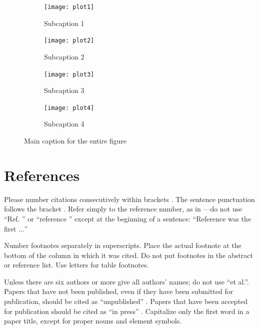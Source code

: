 \documentclass[conference]{IEEEtran}
\begin{document}
\begin{figure}[ht]
  \centering

  \begin{subfigure}{0.45\linewidth}
    \texttt{[image: plot1]}
    \caption{Subcaption 1}
    \label{fig:subfig1}
  \end{subfigure}

  \vspace{0.5cm}

  \begin{subfigure}{0.45\linewidth}
    \texttt{[image: plot2]}
    \caption{Subcaption 2}
    \label{fig:subfig2}
  \end{subfigure}

  \vspace{0.5cm}

  \begin{subfigure}{0.45\linewidth}
    \texttt{[image: plot3]}
    \caption{Subcaption 3}
    \label{fig:subfig3}
  \end{subfigure}

  \vspace{0.5cm}

  \begin{subfigure}{0.45\linewidth}
    \texttt{[image: plot4]}
    \caption{Subcaption 4}
    \label{fig:subfig4}
  \end{subfigure}

  \caption{Main caption for the entire figure}
  \label{fig:mainfigure}
\end{figure}










\section*{References}

Please number citations consecutively within brackets \cite{b1}. The 
sentence punctuation follows the bracket \cite{b2}. Refer simply to the reference 
number, as in \cite{b3}---do not use ``Ref. \cite{b3}'' or ``reference \cite{b3}'' except at 
the beginning of a sentence: ``Reference \cite{b3} was the first $\ldots$''

Number footnotes separately in superscripts. Place the actual footnote at 
the bottom of the column in which it was cited. Do not put footnotes in the 
abstract or reference list. Use letters for table footnotes.

Unless there are six authors or more give all authors' names; do not use 
``et al.''. Papers that have not been published, even if they have been 
submitted for publication, should be cited as ``unpublished'' \cite{b4}. Papers 
that have been accepted for publication should be cited as ``in press'' \cite{b5}. 
Capitalize only the first word in a paper title, except for proper nouns and 
element symbols.
\end{document}
